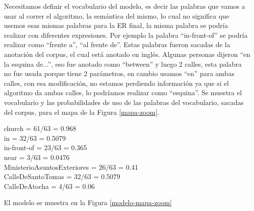Necesitamos definir el vocabulario del modelo, es decir las palabras que vamos a usar al correr el algoritmo, la sem\'antica del mismo, lo cual no significa que usemos esas mismas palabras para la ER final, la misma palabra se podr\'ia realizar con diferentes expresiones. Por ejemplo la palabra ``in-front-of'' se podr\'ia realizar como ``frente a'', ``al frente de''. Estas palabras fueron sacadas de la anotaci\'on del corpus, el cual est\'a anotado en ingl\'es. Algunas personas dijeron ``en la esquina de...'', eso fue anotado como ``between'' y luego 2 calles, esta palabra no fue usada porque tiene 2 par\'ametros, en cambio usamos ``en'' para ambas calles, con esa modificaci\'on, no estamos perdiendo informaci\'on ya que si el algoritmo da ambas calles, lo podr\'iamos realizar como ``esquina''. Se muestra el vocabulario y las probabilidades de uso de las palabras del vocabulario, sacadas del corpus, para el mapa de la Figura \ref{mapa-zoom}.

church = 61/63 = 0.968\\
in = 32/63 = 0.5079\\
in-front-of = 23/63 = 0.365\\
near = 3/63 = 0.0476\\
MinisterioAsuntosExteriores = 26/63 = 0.41\\
CalleDeSantoTomas = 32/63 = 0.5079\\
CalleDeAtocha = 4/63 = 0.06

El modelo se muestra en la Figura \ref{modelo-mapa-zoom}

